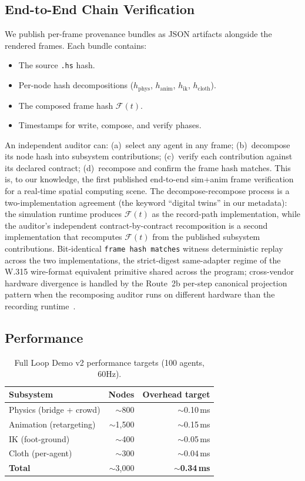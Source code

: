 \documentclass[sigconf,nonacm]{acmart}
\newcommand{\framehash}{\mathcal{F}} %
\begin{document}
\subsection{End-to-End Chain Verification}
We publish per-frame provenance bundles as JSON artifacts
alongside the rendered frames. Each bundle contains:
\begin{itemize}
  \item The source \texttt{.hs} hash.
  \item Per-node hash decompositions ($h_{\text{phys}}$,
    $h_{\text{anim}}$, $h_{\text{ik}}$, $h_{\text{cloth}}$).
  \item The composed frame hash $\framehash(t)$.
  \item Timestamps for write, compose, and verify phases.
\end{itemize}
An independent auditor can: (a)~select any agent in any frame;
(b)~decompose its node hash into subsystem contributions;
(c)~verify each contribution against its declared contract;
(d)~recompose and confirm the frame hash matches. This is,
to our knowledge, the first published end-to-end sim+anim
frame verification for a real-time spatial computing scene.
The decompose-recompose process is a two-implementation
agreement (the keyword ``digital twins'' in our metadata):
the simulation runtime produces $\framehash(t)$ as the
record-path implementation, while the auditor's independent
contract-by-contract recomposition is a second implementation
that recomputes $\framehash(t)$ from the published subsystem
contributions. Bit-identical \texttt{frame hash matches}
witness deterministic replay across the two implementations,
the strict-digest same-adapter regime of the W.315 wire-format
equivalent primitive shared across the program; cross-vendor
hardware divergence is handled by the Route~2b per-step
canonical projection pattern when the recomposing auditor
runs on different hardware than the recording
runtime~\cite{paper-0c-twin-test-2026-05-11}.

\subsection{Performance}

\begin{table}[t]
\centering
\caption{Full Loop Demo v2 performance targets (100 agents, 60Hz).}
\label{tab:perf}
\begin{tabular}{@{}lrr@{}}
\toprule
Subsystem & Nodes & Overhead target \\
\midrule
Physics (bridge + crowd)  & $\sim$800  & $\sim$0.10\,ms \\
Animation (retargeting)   & $\sim$1{,}500 & $\sim$0.15\,ms \\
IK (foot-ground)          & $\sim$400  & $\sim$0.05\,ms \\
Cloth (per-agent)         & $\sim$300  & $\sim$0.04\,ms \\
\midrule
\textbf{Total}            & $\sim$3{,}000 & $\sim$\textbf{0.34\,ms} \\
\bottomrule
\end{tabular}
\end{table}
\end{document}

